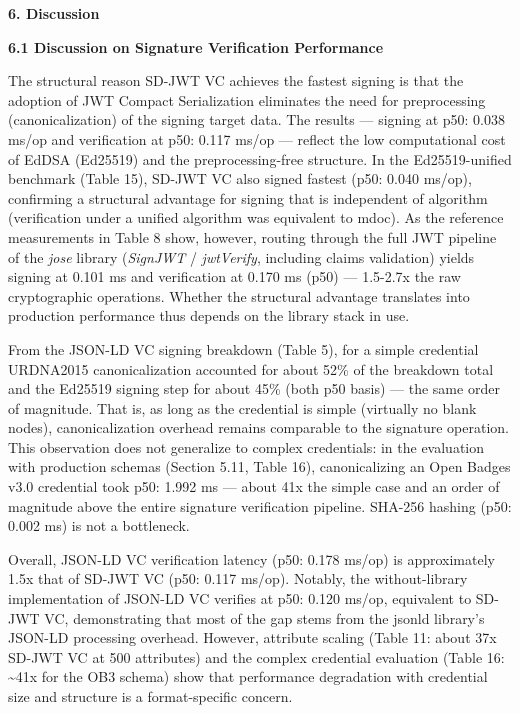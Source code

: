 \textbf{6. Discussion}

\textbf{6.1 Discussion on Signature Verification Performance}

The structural reason SD-JWT VC achieves the fastest signing is that the adoption of JWT Compact Serialization eliminates the need for preprocessing (canonicalization) of the signing target data. The results --- signing at p50: 0.038 ms/op and verification at p50: 0.117 ms/op --- reflect the low computational cost of EdDSA (Ed25519) and the preprocessing-free structure. In the Ed25519-unified benchmark (Table 15), SD-JWT VC also signed fastest (p50: 0.040 ms/op), confirming a structural advantage for signing that is independent of algorithm (verification under a unified algorithm was equivalent to mdoc). As the reference measurements in Table 8 show, however, routing through the full JWT pipeline of the \emph{jose} library (\emph{SignJWT} / \emph{jwtVerify}, including claims validation) yields signing at 0.101 ms and verification at 0.170 ms (p50) --- 1.5-2.7x the raw cryptographic operations. Whether the structural advantage translates into production performance thus depends on the library stack in use.

From the JSON-LD VC signing breakdown (Table 5), for a simple credential URDNA2015 canonicalization accounted for about 52\% of the breakdown total and the Ed25519 signing step for about 45\% (both p50 basis) --- the same order of magnitude. That is, as long as the credential is simple (virtually no blank nodes), canonicalization overhead remains comparable to the signature operation. This observation does not generalize to complex credentials: in the evaluation with production schemas (Section 5.11, Table 16), canonicalizing an Open Badges v3.0 credential took p50: 1.992 ms --- about 41x the simple case and an order of magnitude above the entire signature verification pipeline. SHA-256 hashing (p50: 0.002 ms) is not a bottleneck.

Overall, JSON-LD VC verification latency (p50: 0.178 ms/op) is approximately 1.5x that of SD-JWT VC (p50: 0.117 ms/op). Notably, the without-library implementation of JSON-LD VC verifies at p50: 0.120 ms/op, equivalent to SD-JWT VC, demonstrating that most of the gap stems from the jsonld library's JSON-LD processing overhead. However, attribute scaling (Table 11: about 37x SD-JWT VC at 500 attributes) and the complex credential evaluation (Table 16: \textasciitilde41x for the OB3 schema) show that performance degradation with credential size and structure is a format-specific concern.

